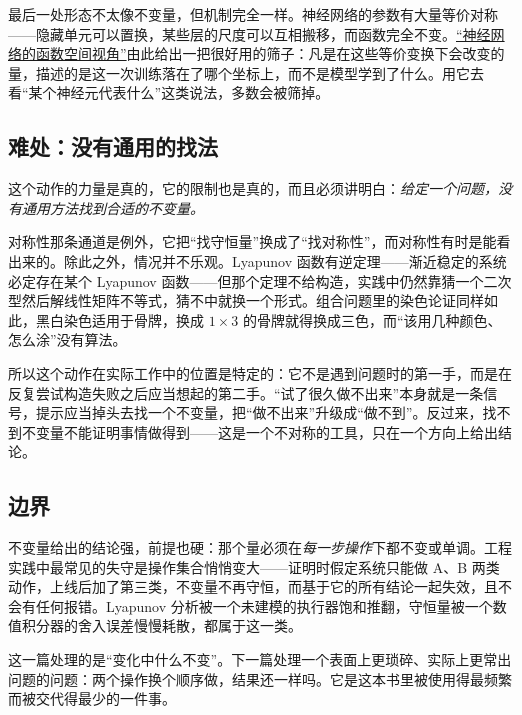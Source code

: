 最后一处形态不太像不变量，但机制完全一样。神经网络的参数有大量等价对称——隐藏单元可以置换，某些层的尺度可以互相搬移，而函数完全不变。\hyperref[sec:14-Deep-Learning/10-Interpretability-Mathematics/01]{``神经网络的函数空间视角''}由此给出一把很好用的筛子：凡是在这些等价变换下会改变的量，描述的是这一次训练落在了哪个坐标上，而不是模型学到了什么。用它去看``某个神经元代表什么''这类说法，多数会被筛掉。

\subsection{难处：没有通用的找法}

这个动作的力量是真的，它的限制也是真的，而且必须讲明白：\emph{给定一个问题，没有通用方法找到合适的不变量。}

对称性那条通道是例外，它把``找守恒量''换成了``找对称性''，而对称性有时是能看出来的。除此之外，情况并不乐观。Lyapunov 函数有逆定理——渐近稳定的系统必定存在某个 Lyapunov 函数——但那个定理不给构造，实践中仍然靠猜一个二次型然后解线性矩阵不等式，猜不中就换一个形式。组合问题里的染色论证同样如此，黑白染色适用于骨牌，换成 \(1\times 3\) 的骨牌就得换成三色，而``该用几种颜色、怎么涂''没有算法。

所以这个动作在实际工作中的位置是特定的：它不是遇到问题时的第一手，而是在反复尝试构造失败之后应当想起的第二手。``试了很久做不出来''本身就是一条信号，提示应当掉头去找一个不变量，把``做不出来''升级成``做不到''。反过来，找不到不变量不能证明事情做得到——这是一个不对称的工具，只在一个方向上给出结论。

\subsection{边界}

不变量给出的结论强，前提也硬：那个量必须在\emph{每一步操作}下都不变或单调。工程实践中最常见的失守是操作集合悄悄变大——证明时假定系统只能做 A、B 两类动作，上线后加了第三类，不变量不再守恒，而基于它的所有结论一起失效，且不会有任何报错。Lyapunov 分析被一个未建模的执行器饱和推翻，守恒量被一个数值积分器的舍入误差慢慢耗散，都属于这一类。

这一篇处理的是``变化中什么不变''。下一篇处理一个表面上更琐碎、实际上更常出问题的问题：两个操作换个顺序做，结果还一样吗。它是这本书里被使用得最频繁而被交代得最少的一件事。
